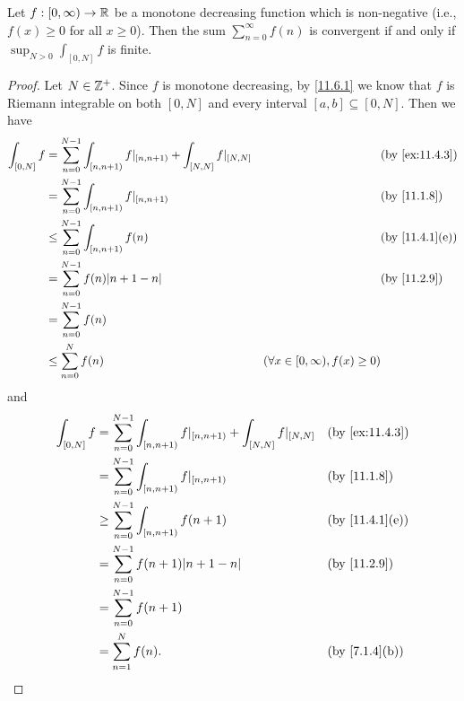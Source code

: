 \begin{prop}\label{11.6.4}
  Let \(f : [0, \infty) \to \mathbb{R}\) be a monotone decreasing function which is non-negative
  (i.e., \(f(x) \geq 0\) for all \(x \geq 0\)).
  Then the sum \(\sum_{n = 0}^\infty f(n)\) is convergent if and only if \(\sup_{N > 0} \int_{[0, N]} f\) is finite.
\end{prop}

\begin{proof}
  Let \(N \in \mathbb{Z}^+\).
  Since \(f\) is monotone decreasing, by \cref{11.6.1} we know that \(f\) is Riemann integrable on both \([0, N]\) and every interval \([a, b] \subseteq [0, N]\).
  Then we have
  \begin{align*}
    \int_{[0, N]} f & = \sum_{n = 0}^{N - 1} \int_{[n, n + 1)} f|_{[n, n + 1)} + \int_{[N, N]} f|_{[N, N]} &                                          & \text{(by \cref{ex:11.4.3})} \\
                    & = \sum_{n = 0}^{N - 1} \int_{[n, n + 1)} f|_{[n, n + 1)}                             &                                          & \text{(by \cref{11.1.8})}    \\
                    & \leq \sum_{n = 0}^{N - 1} \int_{[n, n + 1)} f(n)                                     &                                          & \text{(by \cref{11.4.1}(e))} \\
                    & = \sum_{n = 0}^{N - 1} f(n) \abs{n + 1 - n}                                          &                                          & \text{(by \cref{11.2.9})}    \\
                    & = \sum_{n = 0}^{N - 1} f(n)                                                                                                                                    \\
                    & \leq \sum_{n = 0}^N f(n)                                                             & (\forall x \in [0, \infty), f(x) \geq 0)
  \end{align*}
  and
  \begin{align*}
    \int_{[0, N]} f & = \sum_{n = 0}^{N - 1} \int_{[n, n + 1)} f|_{[n, n + 1)} + \int_{[N, N]} f|_{[N, N]} &  & \text{(by \cref{ex:11.4.3})} \\
                    & = \sum_{n = 0}^{N - 1} \int_{[n, n + 1)} f|_{[n, n + 1)}                             &  & \text{(by \cref{11.1.8})}    \\
                    & \geq \sum_{n = 0}^{N - 1} \int_{[n, n + 1)} f(n + 1)                                 &  & \text{(by \cref{11.4.1}(e))} \\
                    & = \sum_{n = 0}^{N - 1} f(n + 1) \abs{n + 1 - n}                                      &  & \text{(by \cref{11.2.9})}    \\
                    & = \sum_{n = 0}^{N - 1} f(n + 1)                                                                                        \\
                    & = \sum_{n = 1}^N f(n).                                                               &  & \text{(by \cref{7.1.4}(b))}
  \end{align*}


\end{proof}
